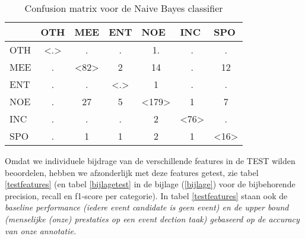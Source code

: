 {{\begin{table}[H]
\centering
\begin{tabular}{|l|c|c|c|c|c|c|}
\hline
    & \multicolumn{1}{l|}{OTH} & \multicolumn{1}{l|}{MEE} & \multicolumn{1}{l|}{ENT} & \multicolumn{1}{l|}{NOE} & \multicolumn{1}{l|}{INC} & \multicolumn{1}{l|}{SPO} \\ \hline
OTH & \textless.\textgreater   & .                        & .                        & 1.                       & .                        & .                        \\ \hline
MEE & .                        & \textless82\textgreater  & 2                        & 14                       & .                        & 12                       \\ \hline
ENT & .                        & .                        & \textless.\textgreater   & 1                        & .                        & .                        \\ \hline
NOE & .                        & 27                       & 5                        & \textless179\textgreater & 1                        & 7                        \\ \hline
INC & .                        & .                        & .                        & 2                        & \textless76\textgreater  & .                        \\ \hline
SPO & .                        & 1                        & 1                        & 2                        & 1                        & \textless16\textgreater  \\ \hline
\end{tabular}
\caption{Confusion matrix voor de Naive Bayes classifier}\label{naivebayes}
\end{table}

Omdat we individuele bijdrage van de verschillende features in de TEST wilden beoordelen, hebben we afzonderlijk met deze features getest,
zie tabel \ref{testfeatures} (en tabel \ref{bijlagetest} in de bijlage (\ref{bijlage}) voor de bijbehorende precision, recall en f1-score per
categorie). In tabel \ref{testfeatures} staan ook de \it{baseline performance} (iedere event candidate is geen event) en de \it{upper bound} (menselijke
(onze) prestaties op een event dection taak) gebaseerd op de accuracy van onze annotatie.

}}

